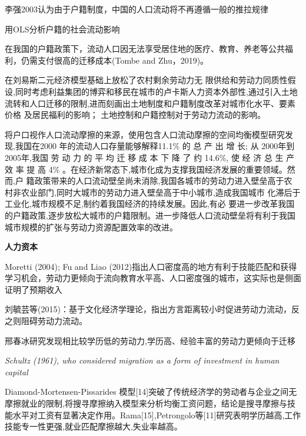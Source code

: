 \documentclass[a4paper,12pt,oneside]{book} %
\begin{document}
李强2003认为由于户籍制度，中国的人口流动将不再遵循一般的推拉规律

\cite{LuYiLongHuKouHuanQiZuoYongMaHuJiZhiDuYuSheHuiFenCengHeLiuDong2008}用OLS分析户籍的社会流动影响

在我国的户籍政策下，流动人口因无法享受居住地的医疗、教育、养老等公共福利，仍需支付很高的迁移成本(Tombe and Zhu，2019)。

\cite{ZhouWenTuDiLiuZhuanHuJiZhiDuGaiGeYuZhongGuoChengShiHuaLiLunYuMoNi2017}
在刘易斯二元经济模型基础上放松了农村剩余劳动力无  限供给和劳动力同质性假设,同时考虑利益集团的博弈和移民在城市的卢卡斯人力资本外部性,通过引入土地流转和人口迁移的限制,进而刻画出土地制度和户籍制度改革对城市化水平、要素价格  及居民福利的影响；
土地控制和户籍控制对于劳动力流动的影响。

\cite{WangLiLiWoGuoRenKouQianYiChengBenChengShiGuiMoYuShengChanLu2020}将户口视作人口流动摩擦的来源，使用包含人口流动摩擦的空间均衡模型研究发现,我国在2000 年的流动人口存量能够解释11.1\% 的 总 产 出 增 长; 从  2000年到2005年,我国 劳 动 力 的 平 均 迁 移 成 本 下 降 了 约 14.6\%, 使 经 济 总  生 产 效 率 提 高 4\% 。在经济新常态下,城市化成为支撑我国经济发展的重要领域。然而,户  籍政策带来的人口流动壁垒尚未消除,我国各城市的劳动力进入壁垒高于农  村非农业部门,同时大城市的劳动力进入壁垒高于中小城市,造成我国城市  化滞后于工业化,城市规模不足,制约着我国经济的持续发展。因此,有必  要进一步改革我国的户籍政策,逐步放松大城市的户籍限制。进一步降低人口流动壁垒将有利于我国城市规模的扩张与劳动力资源配置效率的改进。








\textbf{人力资本}

Moretti (2004); Fu and Liao (2012)指出人口密度高的地方有利于技能匹配和获得学习机会，劳动力更倾向于流向教育水平高、人口密度强的城市，这实际也是侧面证明了预期收入

刘毓芸等(2015)\cite{LiuYuYunLaoDongLiKuaFangYanLiuDongDeDaoUXingMoShi2015}：基于文化经济学理论，指出方言距离较小时促进劳动力流动，反之则阻碍劳动力流动。

邢春冰研究发现相比较学历低的劳动力,学历高、经验丰富的劳动力更倾向于迁移

\textit{Schultz (1961), who considered migration as a form of investment in human capital}

Diamond-Mortensen-Pissarides 模型[14]突破了传统经济学的劳动者与企业之间无摩擦就业的限制,将搜寻摩擦纳入模型来分析均衡工资问题，结论是搜寻摩擦与技能水平对工资有显著决定作用。Rama[15],Petrongolo等[11]研究表明学历越高,工作技能专一性更强,就业匹配摩擦越大,失业率越高。
\end{document}
